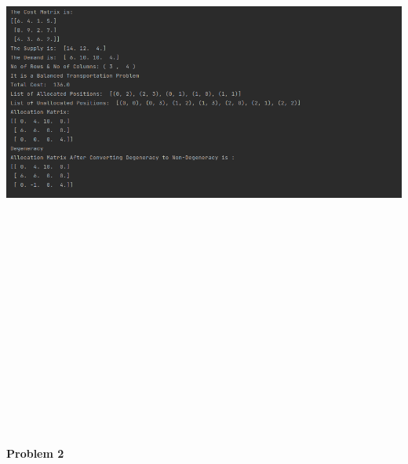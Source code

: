 \documentclass[12pt, letterpaper, twoside]{book}
\begin{document}
\includegraphics[height=600pt,width=550pt]{Output1}
\pagebreak
\begin{center}
\textbf{\\Problem 2}
\end{center}
\end{document}
